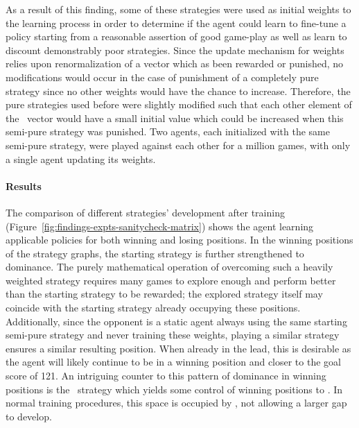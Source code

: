 As a result of this finding,
some of these strategies were used as initial weights to the learning process
in order to determine if the agent could learn to fine-tune a policy starting
from a reasonable assertion of good game-play
as well as learn to discount demonstrably poor strategies.
%
Since the update mechanism for weights relies upon renormalization of a vector
which as been rewarded or punished,
no modifications would occur in the case of punishment of a completely pure strategy
since no other weights would have the chance to increase.
%
Therefore,
the pure strategies used before were slightly modified
such that each other
element of the \wvec\ vector would have a small initial value which could be
increased when this semi-pure strategy was punished.
%
Two agents,
each initialized with the same semi-pure strategy,
were played against each other for a million games,
with only a single agent updating its weights.




\paragraph*{Results}


The comparison of different strategies' development after training
(Figure~\ref{fig:findings-expts-sanitycheck-matrix})
shows the agent learning applicable policies
for both winning and losing positions.
%
In the winning positions of the strategy graphs,
the starting strategy is further strengthened to dominance.
%
The purely mathematical operation of overcoming such a heavily
weighted strategy requires many games to explore enough
and perform better than the starting strategy
to be rewarded;
%
the explored strategy itself
may coincide with the starting strategy
already occupying these positions.
%
Additionally,
since the opponent is a static agent always using the same starting
semi-pure strategy and never training these weights,
playing a similar strategy ensures a similar resulting position.
%
When already in the lead,
this is desirable as the agent will likely continue to be in a winning position
and closer to the goal score of 121.
%
An intriguing counter to this pattern of dominance in winning positions
is the \handmaxavg\ strategy
which yields some control of winning positions to \handmaxmed.
%
In normal training procedures,
this space is occupied by \handmaxmin,
not allowing a larger gap to develop.

